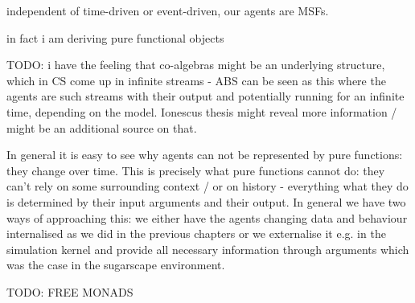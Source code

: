 independent of time-driven or event-driven, our agents are MSFs.

in fact i am deriving pure functional objects

TODO: i have the feeling that co-algebras might be an underlying structure, which in CS come up in infinite streams - ABS can be seen as this where the agents are such streams with their output and potentially running for an infinite time, depending on the model. Ionescus thesis might reveal more information / might be an additional source on that.

In general it is easy to see why agents can not be represented by pure functions: they change over time. This is precisely what pure functions cannot do: they can't rely on some surrounding context / or on history - everything what they do is determined by their input arguments and their output. In general we have two ways of approaching this: we either have the agents changing data and behaviour internalised as we did in the previous chapters or we externalise it e.g. in the simulation kernel and provide all necessary information through arguments which was the case in the sugarscape environment.

TODO: FREE MONADS %
